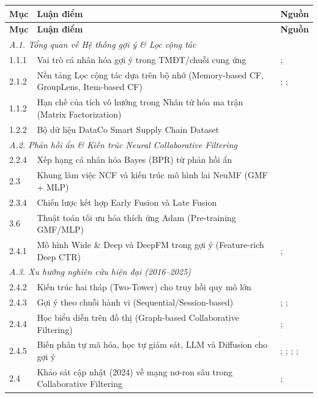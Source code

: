 \begin{longtable}{|p{}|p{}|p{}|}
\hline
\textbf{Mục} & \textbf{Luận điểm} & \textbf{Nguồn} \\
\hline
\endfirsthead
\hline
\textbf{Mục} & \textbf{Luận điểm} & \textbf{Nguồn} \\
\hline
\endhead

\hline
\multicolumn{3}{|l|}{\textit{A.1. Tổng quan về Hệ thống gợi ý \& Lọc cộng tác}} \\
\hline
1.1.1 & Vai trò cá nhân hóa gợi ý trong TMĐT/chuỗi cung ứng &
\textcite{schafer2001commerce}; \textcite{linden2003amazon} \\
\hline
2.1.2 & Nền tảng Lọc cộng tác dựa trên bộ nhớ (Memory-based CF, GroupLens, Item-based CF) &
\textcite{resnick1994grouplens}; \textcite{sarwar2001item}; \textcite{su2009survey} \\
\hline
1.1.2 & Hạn chế của tích vô hướng trong Nhân tử hóa ma trận (Matrix Factorization) &
\textcite{koren2009matrix} \\
\hline
1.2.2 & Bộ dữ liệu DataCo Smart Supply Chain Dataset &
\textcite{dataco2019} \\
\hline

\hline
\multicolumn{3}{|l|}{\textit{A.2. Phản hồi ẩn \& Kiến trúc Neural Collaborative Filtering}} \\
\hline
2.2.4 & Xếp hạng cá nhân hóa Bayes (BPR) từ phản hồi ẩn &
\textcite{rendle2009bpr} \\
\hline
2.3 & Khung làm việc NCF và kiến trúc mô hình lai NeuMF (GMF + MLP) &
\textcite{he2017ncf} \\
\hline
2.3.4 & Chiến lược kết hợp Early Fusion và Late Fusion &
\textcite{he2017ncf} \\
\hline
3.6 & Thuật toán tối ưu hóa thích ứng Adam (Pre-training GMF/MLP) &
\textcite{kingma2014adam} \\
\hline
2.4.1 & Mô hình Wide \& Deep và DeepFM trong gợi ý (Feature-rich Deep CTR) &
\textcite{cheng2016wide}; \textcite{guo2017deepfm} \\
\hline

\hline
\multicolumn{3}{|l|}{\textit{A.3. Xu hướng nghiên cứu hiện đại (2016--2025)}} \\
\hline
2.4.2 & Kiến trúc hai tháp (Two-Tower) cho truy hồi quy mô lớn &
\textcite{covington2016youtube} \\
\hline
2.4.3 & Gợi ý theo chuỗi hành vi (Sequential/Session-based) &
\textcite{hidasi2016gru4rec}; \textcite{kang2018self}; \textcite{sun2019bert4rec} \\
\hline
2.4.4 & Học biểu diễn trên đồ thị (Graph-based Collaborative Filtering) &
\textcite{wang2019ngcf}; \textcite{he2020lightgcn} \\
\hline
2.4.5 & Biến phân tự mã hóa, học tự giám sát, LLM và Diffusion cho gợi ý &
\textcite{liang2018multvae}; \textcite{wu2021sgl}; \textcite{rajput2023tiger}; \textcite{wu2023survey_llm4rec}; \textcite{wei2025diffusion} \\
\hline
2.4 & Khảo sát cập nhật (2024) về mạng nơ-ron sâu trong Collaborative Filtering &
\textcite{li2024dnncf}; \textcite{zhang2019deeplearningsurvey} \\
\hline


\end{longtable}

